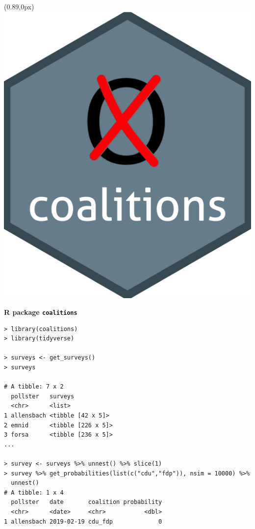 \documentclass[10pt,xcolor=dvipsnames,t,headinclude,headsepline=1.5cm,usepdftitle=false]{beamer}
\begin{document}
\begin{frame}[fragile]
\begin{textblock*}{1.25cm}(0.89\textwidth,0px)
\includegraphics[width=1\textwidth]{figures/coalitions_hex}
\end{textblock*}
\vspace{10px}
\textbf{R package \texttt{coalitions}}
\\[0.7cm]
\begin{lstlisting}
> library(coalitions)
> library(tidyverse)

> surveys <- get_surveys()
> surveys

# A tibble: 7 x 2
  pollster   surveys
  <chr>      <list>
1 allensbach <tibble [42 x 5]>
2 emnid      <tibble [226 x 5]>
3 forsa      <tibble [236 x 5]>
...

> survey <- surveys %>% unnest() %>% slice(1)
> survey %>% get_probabilities(list(c("cdu","fdp")), nsim = 10000) %>%
  unnest()
# A tibble: 1 x 4
  pollster   date       coalition probability
  <chr>      <date>     <chr>           <dbl>
1 allensbach 2019-02-19 cdu_fdp             0
\end{lstlisting}
\end{frame}
\end{document}
